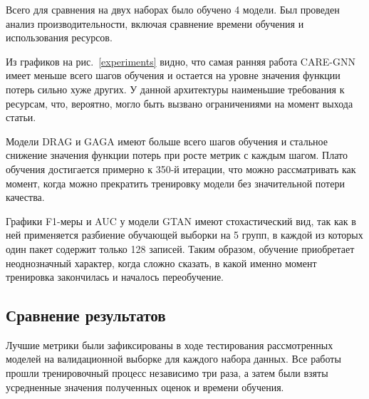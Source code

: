 Всего для сравнения на двух наборах было обучено 4 модели. Был проведен анализ производительности, включая сравнение времени обучения и использования ресурсов.

Из графиков на рис.~\ref{experiments} видно, что самая ранняя работа CARE-GNN имеет меньше всего шагов обучения и остается на уровне значения функции потерь сильно хуже других. У данной архитектуры наименьшие требования к ресурсам, что, вероятно, могло быть вызвано ограничениями на момент выхода статьи.

Модели DRAG \cite{kim2023} и GAGA \cite{wang2023} имеют больше всего шагов обучения и стальное снижение значения функции потерь при росте метрик с каждым шагом. Плато обучения достигается примерно к 350-й итерации, что можно рассматривать как момент, когда можно прекратить тренировку модели без значительной потери качества.

Графики F1-меры и AUC у модели GTAN \cite{xiang2023} имеют стохастический вид, так как в ней применяется разбиение обучающей выборки на 5 групп, в каждой из которых один пакет содержит только 128 записей. Таким образом, обучение приобретает неоднозначный характер, когда сложно сказать, в какой именно момент тренировка закончилась и началось переобучение.

\pagebreak



\subsection{Сравнение результатов}

Лучшие метрики были зафиксированы в ходе тестирования рассмотренных моделей на валидационной выборке для каждого набора данных. Все работы прошли тренировочный процесс независимо три раза, а затем были взяты усредненные значения полученных оценок и времени обучения.

